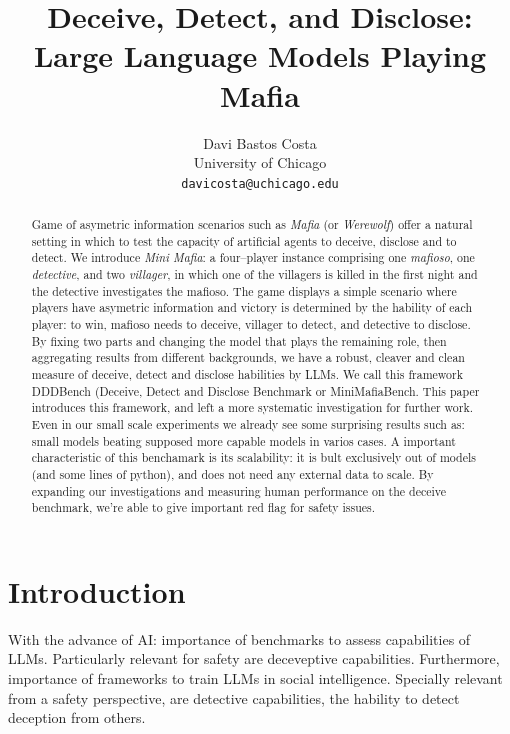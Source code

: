 \documentclass{article}
\title{Deceive, Detect, and Disclose: \\ Large Language Models Playing Mafia}
\author{%
  Davi Bastos Costa \\
  University of Chicago \\
  \texttt{davicosta@uchicago.edu} \\
}
\begin{document}
\maketitle

\begin{abstract}
Game of asymetric information scenarios such as \emph{Mafia} (or \emph{Werewolf}) offer a natural setting in which to test the capacity of artificial agents to deceive, disclose and to detect.  We introduce \textit{Mini Mafia}: a four--player instance comprising one \emph{mafioso}, one \emph{detective}, and two \emph{villager}, in which one of the villagers is killed in the first night and the detective investigates the mafioso. The game displays a simple scenario where players have asymetric information and victory is determined by the hability of each player: to win, mafioso needs to deceive, villager to detect, and detective to disclose. By fixing two parts and changing the model that plays the remaining role, then aggregating results from different backgrounds, we have a robust, cleaver and clean measure of deceive, detect and disclose habilities by LLMs. We call this framework DDDBench (Deceive, Detect and Disclose Benchmark or MiniMafiaBench. This paper introduces this framework, and left a more systematic investigation for further work. Even in our small scale experiments we already see some surprising results such as: small models beating supposed more capable models in varios cases. A important characteristic of this benchamark is its scalability: it is bult exclusively out of models (and some lines of python), and does not need any external data to scale. By expanding our investigations and measuring human performance on the deceive benchmark, we're able to give important red flag for safety issues.
\end{abstract}

\tableofcontents

\section{Introduction}

With the advance of AI: importance of benchmarks to assess capabilities of LLMs.
Particularly relevant for safety are deceveptive capabilities.   
Furthermore, importance of frameworks to train LLMs in social intelligence. 
Specially relevant from a safety perspective, are detective capabilities, the hability to detect deception from others.
\end{document}
